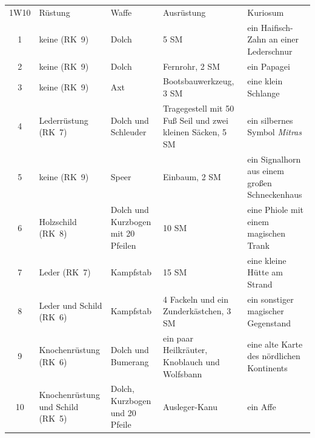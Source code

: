 \documentclass[11pt]{wbzine}
\begin{document}
\begin{tabularx}{\textwidth}{cZZZZ}
    1W10 & Rüstung & Waffe & Ausrüstung & Kuriosum \\
1 &
    keine (RK~9) &
    Dolch &
    5 SM &
    ein Haifisch-Zahn an einer Lederschnur \\

2 &
    keine (RK~9) &
    Dolch &
    Fernrohr, 2 SM &
    ein Papagei \\

3 &
 keine (RK~9) &
   Axt &
  Bootsbauwerkzeug, 3 SM &
  eine klein Schlange \\

4 &
 Lederrüstung (RK~7) &
 Dolch und Schleuder &
 Tragegestell mit 50 Fuß Seil und zwei kleinen Säcken, 5 SM &
    ein silbernes Symbol \textit{Mitras}\\

5 &
 keine (RK~9) &
 Speer &
 Einbaum, 2 SM &
 ein Signalhorn aus einem großen Schneckenhaus\\

6 &
 Holzschild (RK~8) &
 Dolch und Kurzbogen mit 20 Pfeilen & 
 10 SM &
 eine Phiole mit einem magischen Trank\\

7 &
 Leder (RK~7) &
 Kampfstab &
 15 SM &
 eine kleine Hütte am Strand\\

8 &
 Leder und Schild (RK~6) &
 Kampfstab &
 4 Fackeln und ein Zunderkästchen, 3 SM &
 ein sonstiger magischer Gegenstand\\

9 &
 Knochenrüstung (RK~6) &
 Dolch und Bumerang &
 ein paar Heilkräuter, Knoblauch und Wolfsbann &
 eine alte Karte des nördlichen Kontinents \\

10 &
 Knochenrüstung und Schild (RK~5) &
 Dolch, Kurzbogen und 20 Pfeile &
 Ausleger-Kanu &
 ein Affe \\

\end{tabularx}
\end{document}
